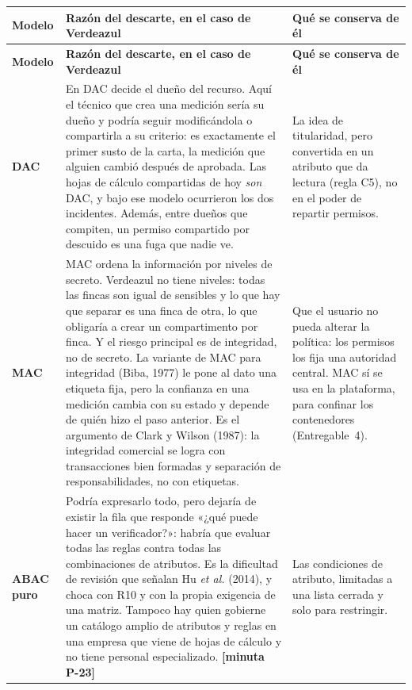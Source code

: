 \documentclass[11pt,letterpaper]{article}
\newcommand{\cab}[1]{\textbf{\rmfamily #1}}
\newcommand{\resp}[1]{\textrm{\footnotesize\bfseries [minuta #1]}}
\begin{document}
{\small
\renewcommand{\arraystretch}{1.18}
\begin{longtable}{@{}L{1.5cm} L{9.7cm} L{4.2cm}@{}}
\toprule
\cab{Modelo} & \cab{Razón del descarte, en el caso de Verdeazul} & \cab{Qué se conserva de él} \\
\midrule
\endfirsthead
\toprule
\cab{Modelo} & \cab{Razón del descarte, en el caso de Verdeazul} & \cab{Qué se conserva de él} \\
\midrule
\endhead
\bottomrule
\endfoot
\textbf{DAC} &
En DAC decide el dueño del recurso. Aquí el técnico que crea una medición sería su dueño y podría
seguir modificándola o compartirla a su criterio: es exactamente el primer susto de la carta, la
medición que alguien cambió después de aprobada. Las hojas de cálculo compartidas de hoy \emph{son}
DAC, y bajo ese modelo ocurrieron los dos incidentes. Además, entre dueños que compiten, un permiso
compartido por descuido es una fuga que nadie ve. &
La idea de titularidad, pero convertida en un atributo que da lectura (regla C5), no en el poder de
repartir permisos. \\
\textbf{MAC} &
MAC ordena la información por niveles de secreto. Verdeazul no tiene niveles: todas las fincas son
igual de sensibles y lo que hay que separar es una finca de otra, lo que obligaría a crear un
compartimento por finca. Y el riesgo principal es de integridad, no de secreto. La variante de MAC
para integridad (Biba, 1977) le pone al dato una etiqueta fija, pero la confianza en una medición
cambia con su estado y depende de quién hizo el paso anterior. Es el argumento de Clark y Wilson
(1987): la integridad comercial se logra con transacciones bien formadas y separación de
responsabilidades, no con etiquetas. &
Que el usuario no pueda alterar la política: los permisos los fija una autoridad central. MAC sí se usa en la
plataforma, para confinar los contenedores (Entregable~4). \\
\textbf{ABAC puro} &
Podría expresarlo todo, pero dejaría de existir la fila que responde «¿qué puede hacer un
verificador?»: habría que evaluar todas las reglas contra todas las combinaciones de atributos. Es
la dificultad de revisión que señalan Hu \emph{et al.} (2014), y choca con R10 y con la propia
exigencia de una matriz. Tampoco hay quien gobierne un catálogo amplio de atributos y reglas en una
empresa que viene de hojas de cálculo y no tiene personal especializado. \resp{P-23} &
Las condiciones de atributo, limitadas a una lista cerrada y solo para restringir. \\
\end{longtable}
}
\end{document}
